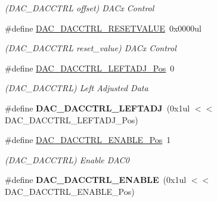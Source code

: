 \begin{DoxyCompactItemize}
\begin{DoxyCompactList}\small\item\em (D\+A\+C\+\_\+\+D\+A\+C\+C\+T\+R\+L offset) D\+A\+Cx Control \end{DoxyCompactList}\item 
\hypertarget{group___s_a_m_l21___d_a_c_ga3035c8be28b7caae01f7d985eefa0240}{}\#define \hyperlink{group___s_a_m_l21___d_a_c_ga3035c8be28b7caae01f7d985eefa0240}{D\+A\+C\+\_\+\+D\+A\+C\+C\+T\+R\+L\+\_\+\+R\+E\+S\+E\+T\+V\+A\+L\+U\+E}~0x0000ul\label{group___s_a_m_l21___d_a_c_ga3035c8be28b7caae01f7d985eefa0240}

\begin{DoxyCompactList}\small\item\em (D\+A\+C\+\_\+\+D\+A\+C\+C\+T\+R\+L reset\+\_\+value) D\+A\+Cx Control \end{DoxyCompactList}\item 
\hypertarget{group___s_a_m_l21___d_a_c_gaa211888989fa388c431ac25dea23b398}{}\#define \hyperlink{group___s_a_m_l21___d_a_c_gaa211888989fa388c431ac25dea23b398}{D\+A\+C\+\_\+\+D\+A\+C\+C\+T\+R\+L\+\_\+\+L\+E\+F\+T\+A\+D\+J\+\_\+\+Pos}~0\label{group___s_a_m_l21___d_a_c_gaa211888989fa388c431ac25dea23b398}

\begin{DoxyCompactList}\small\item\em (D\+A\+C\+\_\+\+D\+A\+C\+C\+T\+R\+L) Left Adjusted Data \end{DoxyCompactList}\item 
\hypertarget{group___s_a_m_l21___d_a_c_gae967f060155c9faf29e8cf4efa45abb5}{}\#define {\bfseries D\+A\+C\+\_\+\+D\+A\+C\+C\+T\+R\+L\+\_\+\+L\+E\+F\+T\+A\+D\+J}~(0x1ul $<$$<$ D\+A\+C\+\_\+\+D\+A\+C\+C\+T\+R\+L\+\_\+\+L\+E\+F\+T\+A\+D\+J\+\_\+\+Pos)\label{group___s_a_m_l21___d_a_c_gae967f060155c9faf29e8cf4efa45abb5}

\item 
\hypertarget{group___s_a_m_l21___d_a_c_ga8ff7f04caf3d817ce0400efb42538924}{}\#define \hyperlink{group___s_a_m_l21___d_a_c_ga8ff7f04caf3d817ce0400efb42538924}{D\+A\+C\+\_\+\+D\+A\+C\+C\+T\+R\+L\+\_\+\+E\+N\+A\+B\+L\+E\+\_\+\+Pos}~1\label{group___s_a_m_l21___d_a_c_ga8ff7f04caf3d817ce0400efb42538924}

\begin{DoxyCompactList}\small\item\em (D\+A\+C\+\_\+\+D\+A\+C\+C\+T\+R\+L) Enable D\+A\+C0 \end{DoxyCompactList}\item 
\hypertarget{group___s_a_m_l21___d_a_c_ga6ac83f6e5e81f4ceed5387bf4c971ab9}{}\#define {\bfseries D\+A\+C\+\_\+\+D\+A\+C\+C\+T\+R\+L\+\_\+\+E\+N\+A\+B\+L\+E}~(0x1ul $<$$<$ D\+A\+C\+\_\+\+D\+A\+C\+C\+T\+R\+L\+\_\+\+E\+N\+A\+B\+L\+E\+\_\+\+Pos)\label{group___s_a_m_l21___d_a_c_ga6ac83f6e5e81f4ceed5387bf4c971ab9}


\end{DoxyCompactItemize}
